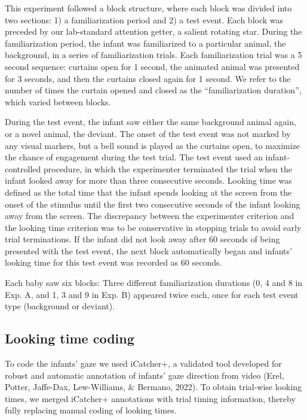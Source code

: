 \documentclass[10pt, letterpaper]{article}
\begin{document}
This experiment followed a block structure, where each block was divided
into two sections: 1) a familiarization period and 2) a test event. Each
block was preceded by our lab-standard attention getter, a salient
rotating star. During the familiarization period, the infant was
familiarized to a particular animal, the background, in a series of
familiarization trials. Each familiarization trial was a 5 second
sequence: curtains open for 1 second, the animated animal was presented
for 3 seconds, and then the curtains closed again for 1 second. We refer
to the number of times the curtain opened and closed as the
``familiarization duration'', which varied between blocks.

During the test event, the infant saw either the same background animal
again, or a novel animal, the deviant. The onset of the test event was
not marked by any visual markers, but a bell sound is played as the
curtains open, to maximize the chance of engagement during the test
trial. The test event used an infant-controlled procedure, in which the
experimenter terminated the trial when the infant looked away for more
than three consecutive seconds. Looking time was defined as the total
time that the infant spends looking at the screen from the onset of the
stimulus until the first two consecutive seconds of the infant looking
away from the screen. The discrepancy between the experimenter criterion
and the looking time criterion was to be conservative in stopping trials
to avoid early trial terminations. If the infant did not look away after
60 seconds of being presented with the test event, the next block
automatically began and infants' looking time for this test event was
recorded as 60 seconds.

Each baby saw six blocks: Three different familiarization durations (0,
4 and 8 in Exp. A, and 1, 3 and 9 in Exp. B) appeared twice each, once
for each test event type (background or deviant).

\hypertarget{looking-time-coding}{%
\subsection{Looking time coding}\label{looking-time-coding}}

To code the infants' gaze we used iCatcher+, a validated tool developed
for robust and automatic annotation of infants' gaze direction from
video (Erel, Potter, Jaffe-Dax, Lew-Williams, \& Bermano, 2022). To
obtain trial-wise looking times, we merged iCatcher+ annotations with
trial timing information, thereby fully replacing manual coding of
looking times.
\end{document}
